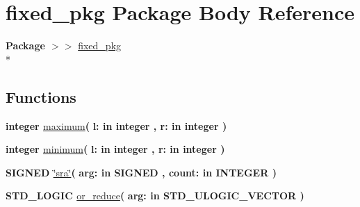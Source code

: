 \hypertarget{class__fixed__pkg}{}\section{fixed\+\_\+pkg Package Body Reference}
\label{class__fixed__pkg}
{\bfseries Package $>$$>$ }\hyperlink{classfixed__pkg}{fixed\+\_\+pkg}\\*
\subsection*{Functions}
 \begin{DoxyCompactItemize}
\item 
{\bfseries {\bfseries \textcolor{comment}{integer}\textcolor{vhdlchar}{ }}} \hyperlink{class__fixed__pkg_af2301504e3110d03c0942d108342fa4a}{maximum}{\bfseries  ( }{\bfseries \textcolor{vhdlchar}{l\+: }\textcolor{stringliteral}{in }{\bfseries \textcolor{comment}{integer}\textcolor{vhdlchar}{ }}}{\bfseries  , \textcolor{vhdlchar}{r\+: }\textcolor{stringliteral}{in }{\bfseries \textcolor{comment}{integer}\textcolor{vhdlchar}{ }}}{\bfseries  )} 
\item 
{\bfseries {\bfseries \textcolor{comment}{integer}\textcolor{vhdlchar}{ }}} \hyperlink{class__fixed__pkg_a4a31513d347a2ff169424c2e038ca049}{minimum}{\bfseries  ( }{\bfseries \textcolor{vhdlchar}{l\+: }\textcolor{stringliteral}{in }{\bfseries \textcolor{comment}{integer}\textcolor{vhdlchar}{ }}}{\bfseries  , \textcolor{vhdlchar}{r\+: }\textcolor{stringliteral}{in }{\bfseries \textcolor{comment}{integer}\textcolor{vhdlchar}{ }}}{\bfseries  )} 
\item 
{\bfseries {\bfseries \textcolor{comment}{S\+I\+G\+N\+E\+D}\textcolor{vhdlchar}{ }}} \hyperlink{class__fixed__pkg_a2256231b1578164e042607f13be97d4f}{\char`\"{}sra\char`\"{}}{\bfseries  ( }{\bfseries \textcolor{vhdlchar}{arg\+: }\textcolor{stringliteral}{in }{\bfseries \textcolor{comment}{S\+I\+G\+N\+E\+D}\textcolor{vhdlchar}{ }}}{\bfseries  , \textcolor{vhdlchar}{count\+: }\textcolor{stringliteral}{in }{\bfseries \textcolor{comment}{I\+N\+T\+E\+G\+E\+R}\textcolor{vhdlchar}{ }}}{\bfseries  )} 
\item 
{\bfseries {\bfseries \textcolor{comment}{S\+T\+D\+\_\+\+L\+O\+G\+I\+C}\textcolor{vhdlchar}{ }}} \hyperlink{class__fixed__pkg_a6dd56334cdc903b44d0a90d975059507}{or\+\_\+reduce}{\bfseries  ( }{\bfseries \textcolor{vhdlchar}{arg\+: }\textcolor{stringliteral}{in }{\bfseries \textcolor{comment}{S\+T\+D\+\_\+\+U\+L\+O\+G\+I\+C\+\_\+\+V\+E\+C\+T\+O\+R}\textcolor{vhdlchar}{ }}}{\bfseries  )} 

\end{DoxyCompactItemize}
